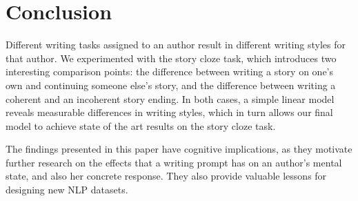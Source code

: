 \documentclass[11pt,a4paper]{article}
\newcommand{\isectionb}[1]{\section{#1}\label{ssec:#1}}
\newcommand{\resolved}[1]{}
\newcommand{\nascomment}[1]{{\color{blue}\textsc{[#1 --nas]}}}
\renewcommand{\nascomment}[1]{}
\begin{document}
\isectionb{Conclusion}

Different writing tasks assigned to an author result in different
writing styles for that author.
We experimented with the story cloze task, which introduces two interesting comparison points: %
 the difference between writing a story on one's own and continuing someone else's story,
 and the difference between writing a coherent and an incoherent story ending.
In both cases, a simple linear model reveals measurable differences in writing styles, %
which in turn allows our final 
model to achieve state of the art results on the story cloze task.

The findings presented in this paper have  cognitive implications, as
they motivate further research on the effects that a writing
prompt has on an author's mental state, and also her concrete response.
They also provide valuable lessons for designing new NLP datasets.
 \resolved{\nascomment{drop the last sentence, it makes this paper seem less
  complete} Future work will include testing whether other similar writing tasks, such as fake news, also impose their own unique and identifiable style on their authors.}




%
%



\end{document}
